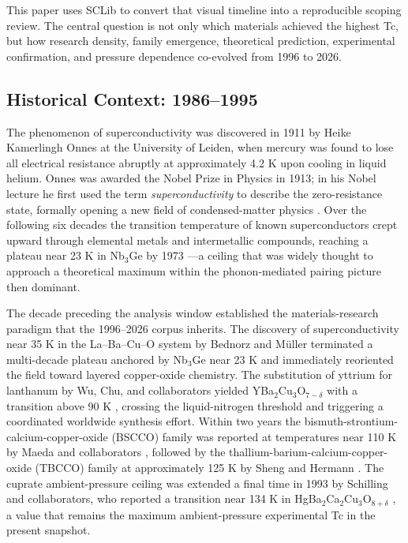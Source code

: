 \documentclass[11pt]{article}
\begin{document}
This paper uses SCLib to convert that visual timeline into a reproducible scoping review. The central question is not only which materials achieved the highest Tc, but how research density, family emergence, theoretical prediction, experimental confirmation, and pressure dependence co-evolved from 1996 to 2026.

\subsection{Historical Context: 1986--1995}

The phenomenon of superconductivity was discovered in 1911 by Heike Kamerlingh Onnes at the University of Leiden, when mercury was found to lose all electrical resistance abruptly at approximately 4.2 K upon cooling in liquid helium. Onnes was awarded the Nobel Prize in Physics in 1913; in his Nobel lecture he first used the term \emph{superconductivity} to describe the zero-resistance state, formally opening a new field of condensed-matter physics \cite{onnes1911}. Over the following six decades the transition temperature of known superconductors crept upward through elemental metals and intermetallic compounds, reaching a plateau near 23 K in Nb$_3$Ge by 1973 \cite{gavaler1973}---a ceiling that was widely thought to approach a theoretical maximum within the phonon-mediated pairing picture then dominant.

The decade preceding the analysis window established the materials-research paradigm that the 1996--2026 corpus inherits. The discovery of superconductivity near 35 K in the La--Ba--Cu--O system by Bednorz and M\"uller \cite{bednorz1986labacuo} terminated a multi-decade plateau anchored by Nb$_3$Ge near 23 K and immediately reoriented the field toward layered copper-oxide chemistry. The substitution of yttrium for lanthanum by Wu, Chu, and collaborators yielded YBa$_2$Cu$_3$O$_{7-\delta}$ with a transition above 90 K \cite{wu1987ybco}, crossing the liquid-nitrogen threshold and triggering a coordinated worldwide synthesis effort. Within two years the bismuth-strontium-calcium-copper-oxide (BSCCO) family was reported at temperatures near 110 K by Maeda and collaborators \cite{maeda1988bscco}, followed by the thallium-barium-calcium-copper-oxide (TBCCO) family at approximately 125 K by Sheng and Hermann \cite{sheng1988tbcco}. The cuprate ambient-pressure ceiling was extended a final time in 1993 by Schilling and collaborators, who reported a transition near 134 K in HgBa$_2$Ca$_2$Cu$_3$O$_{8+\delta}$ \cite{schilling1993hgcuprate}, a value that remains the maximum ambient-pressure experimental Tc in the present snapshot.
\end{document}
